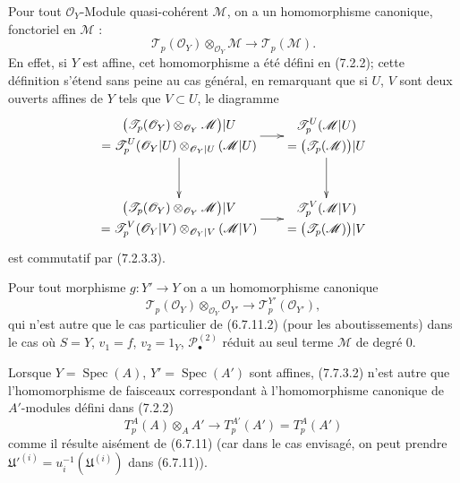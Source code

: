 \begin{env}[7.7.3]
Pour tout $\mathscr O_Y$-Module quasi-cohérent $\mathscr M$, on a un
homomorphisme canonique, fonctoriel en $\mathscr M$ :
\[
  \mathscr T_p(\mathscr O_Y)\otimes_{\mathscr O_Y}\mathscr M
  \longrightarrow
  \mathscr T_p(\mathscr M).
  \tag{7.7.3.1}\label{III.7.7.3.1.fr}
\]
En effet, si $Y$ est affine, cet homomorphisme a été défini en (7.2.2); cette
définition s'étend sans peine au cas général, en remarquant que si $U$, $V$ sont
deux ouverts affines de $Y$ tels que $V\subset U$, le diagramme
\[
\xymatrix@C=18pt@R=32pt{
  {\begin{gathered}
    \bigl(\mathscr T_p(\mathscr O_Y)
      \otimes_{\mathscr O_Y}\mathscr M\bigr)|U\\
    =\mathscr T^U_p(\mathscr O_Y|U)
      \otimes_{\mathscr O_Y|U}(\mathscr M|U)
  \end{gathered}}
  \ar[r]\ar[d]
  &
  {\begin{gathered}
    \mathscr T^U_p(\mathscr M|U)\\
    =\bigl(\mathscr T_p(\mathscr M)\bigr)|U
  \end{gathered}}
  \ar[d]
  \\
  {\begin{gathered}
    \bigl(\mathscr T_p(\mathscr O_Y)
      \otimes_{\mathscr O_Y}\mathscr M\bigr)|V\\
    =\mathscr T^V_p(\mathscr O_Y|V)
      \otimes_{\mathscr O_Y|V}(\mathscr M|V)
  \end{gathered}}
  \ar[r]
  &
  {\begin{gathered}
    \mathscr T^V_p(\mathscr M|V)\\
    =\bigl(\mathscr T_p(\mathscr M)\bigr)|V
  \end{gathered}}
}
\]
est commutatif par (7.2.3.3).

Pour tout morphisme $g:Y'\to Y$ on a un homomorphisme canonique
\[
  \mathscr T_p(\mathscr O_Y)\otimes_{\mathscr O_Y}\mathscr O_{Y'}
  \longrightarrow
  \mathscr T^{Y'}_p(\mathscr O_{Y'}),
  \tag{7.7.3.2}\label{III.7.7.3.2.fr}
\]
qui n'est autre que le cas particulier de (6.7.11.2) (pour les aboutissements)
dans le cas où $S=Y$, $v_1=f$, $v_2=1_Y$, $\mathscr P^{(2)}_\bullet$ réduit au
seul terme $\mathscr M$ de degré 0.

Lorsque $Y=\operatorname{Spec}(A)$, $Y'=\operatorname{Spec}(A')$ sont affines,
(7.7.3.2) n'est autre que l'homomorphisme de faisceaux correspondant à
l'homomorphisme canonique de $A'$-modules défini dans (7.2.2)
\[
  T^A_p(A)\otimes_A A'
  \longrightarrow
  T^{A'}_p(A')=T^A_p(A')
\]
comme il résulte aisément de (6.7.11) (car dans le cas envisagé, on peut prendre
$\mathfrak U'^{(i)}=u_i^{-1}(\mathfrak U^{(i)})$ dans (6.7.11)).
\end{env}


